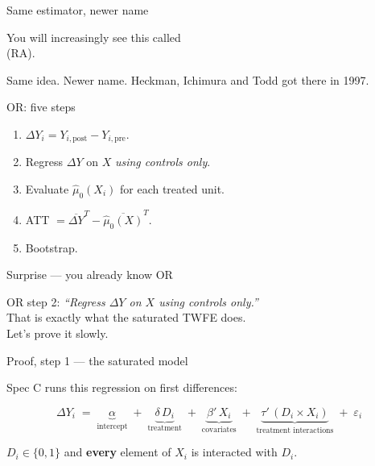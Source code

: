 \documentclass[aspectratio=169,11pt]{beamer}
\begin{document}
\begin{frame}{Same estimator, newer name}
\vspace{1.8em}
\begin{center}
\Large
You will increasingly see this called \\[0.4em]  \;(RA).
\end{center}
\vspace{1.6em}
\begin{center}\color{warmgray}
Same idea. \;Newer name. \;Heckman, Ichimura and Todd got there in 1997.
\end{center}
\end{frame}

\begin{frame}{OR: five steps}
\vspace{0.8em}
\begin{enumerate}\setlength\itemsep{0.5em}
  \item {} \;$\Delta Y_i = Y_{i,\mathrm{post}} - Y_{i,\mathrm{pre}}$.
  \item {} \;Regress $\Delta Y$ on $X$ \textit{using controls only}.
  \item {} \;Evaluate $\hat\mu_0(X_i)$ for each treated unit.
  \item {} \;ATT $= \overline{\Delta Y}^T - \overline{\hat\mu_0(X)}^T$.
  \item {} \;Bootstrap.
\end{enumerate}
\end{frame}

\begin{frame}{Surprise --- you already know OR}
\vspace{0.8em}
\begin{center}
\large
OR step 2: \emph{``Regress $\Delta Y$ on $X$ using controls only.''}\\[0.8em]
\color{warmgray}\normalsize
That is exactly what the saturated TWFE does.\\[0.4em]
Let's prove it slowly.
\end{center}
\end{frame}

\begin{frame}{Proof, step 1 --- the saturated model}
\vspace{0.4em}
\begin{center}\color{warmgray}\small
Spec C runs this regression on first differences:\end{center}
\vspace{0.3em}
\[
\Delta Y_i \;=\; \underbrace{\alpha}_{\text{intercept}}
            \;+\; \underbrace{\delta\, D_i}_{\text{treatment}}
            \;+\; \underbrace{\beta'\, X_i}_{\text{covariates}}
            \;+\; \underbrace{\tau'\,(D_i \times X_i)}_{\text{treatment interactions}}
            \;+\; \varepsilon_i
\]
\vspace{0.4em}
\begin{center}
$D_i \in \{0, 1\}$ \quad and \quad \textbf{every} element of $X_i$ is interacted with $D_i$.
\end{center}
\end{frame}
\end{document}
